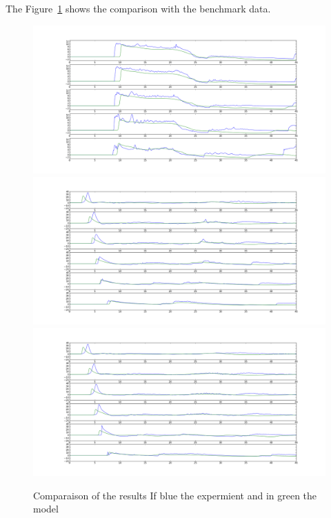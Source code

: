 The Figure~\ref{fig:triang:res} shows the comparison with the benchmark data.
\begin{figure}
\centering
\includegraphics[width=.8\textwidth]{img/res_X25.png}
\includegraphics[width=.8\textwidth]{img/res_Y0.png}
\includegraphics[width=.8\textwidth]{img/res_Y-5.png}
\caption{Comparaison of the results If blue the expermient and in green the model}\label{fig:triang:res}
\end{figure}
